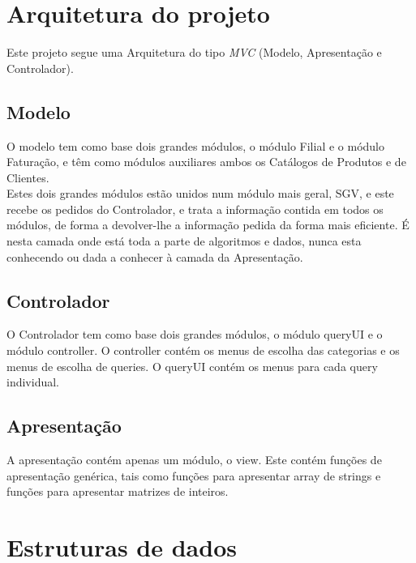 \documentclass[a4paper]{report}
\begin{document}
\chapter{Arquitetura do projeto}

Este projeto segue uma Arquitetura do tipo \textit{MVC} (Modelo, Apresentação e
Controlador).

\section{Modelo}

O modelo tem como base dois grandes módulos, o módulo Filial e o módulo Faturação,
e têm como módulos auxiliares ambos os Catálogos de Produtos e de Clientes.\\
Estes dois grandes módulos estão unidos num módulo mais geral, SGV, e este recebe
os pedidos do Controlador, e trata a informação contida em todos os módulos, de 
forma a devolver-lhe a informação pedida da forma mais eficiente. É nesta camada
onde está toda a parte de algoritmos e dados, nunca esta conhecendo ou dada a
conhecer à camada da Apresentação.

\section{Controlador}

O Controlador tem como base dois grandes módulos, o módulo queryUI e o módulo controller.
O controller contém os menus de escolha das categorias e os menus de escolha de queries.
O queryUI contém os menus para cada query individual.

\section{Apresentação}

A apresentação contém apenas um módulo, o view. Este contém funções de apresentação genérica,
tais como funções para apresentar array de strings e funções para apresentar matrizes de inteiros.

\chapter{Estruturas de dados}
\end{document}
